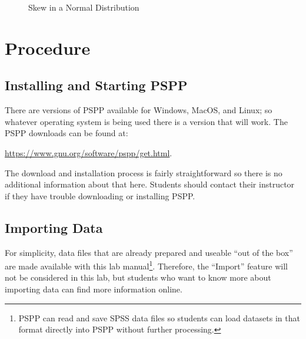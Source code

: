 \begin{figure}[H]
  \begin{center}
  \end{center}
  \caption{Skew in a Normal Distribution}
  \label{lab01_fig13}
\end{figure}

\section{Procedure}

\subsection{Installing and Starting PSPP} 

There are versions of \acs{PSPP} available for Windows, MacOS, and Linux; so whatever operating system is being used there is a version that will work. The \acs{PSPP} downloads can be found at:

\url{https://www.gnu.org/software/pspp/get.html}. 

The download and installation process is fairly straightforward so there is no additional information about that here. Students should contact their instructor if they have trouble downloading or installing \acs{PSPP}.

\subsection{Importing Data}

For simplicity, data files that are already prepared and useable ``out of the box'' are made available with this lab manual\footnote{\acs{PSPP} can read and save \acs{SPSS} data files so students can load datasets in that format directly into \acs{PSPP} without further processing.}. Therefore, the ``Import'' feature will not be considered in this lab, but students who want to know more about importing data can find more information online. 


